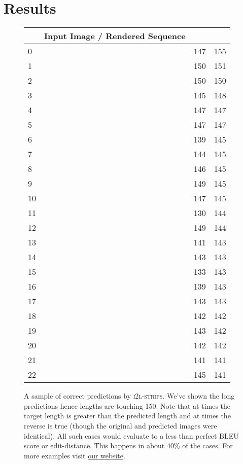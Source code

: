 \documentclass{article}
\newcommand{\website}{https://untrix.github.io/i2l/}
\begin{document}
\section{Results}
\begin{figure*}\begin{tabular}{llcc}
		& Input Image / Rendered Sequence &  &  \\
		\hline
		\scriptsize{0} &  & \scriptsize{147} & \scriptsize{155} \\
\scriptsize{1} &  & \scriptsize{150} & \scriptsize{151} \\
\scriptsize{2} &  & \scriptsize{150} & \scriptsize{150} \\
\scriptsize{3} &  & \scriptsize{145} & \scriptsize{148} \\
\scriptsize{4} &  & \scriptsize{147} & \scriptsize{147} \\
\scriptsize{5} &  & \scriptsize{147} & \scriptsize{147} \\
\scriptsize{6} &  & \scriptsize{139} & \scriptsize{145} \\
\scriptsize{7} &  & \scriptsize{144} & \scriptsize{145} \\
\scriptsize{8} &  & \scriptsize{146} & \scriptsize{145} \\
\scriptsize{9} &  & \scriptsize{149} & \scriptsize{145} \\
\scriptsize{10} &  & \scriptsize{147} & \scriptsize{145} \\
\scriptsize{11} &  & \scriptsize{130} & \scriptsize{144} \\
\scriptsize{12} &  & \scriptsize{149} & \scriptsize{144} \\
\scriptsize{13} &  & \scriptsize{141} & \scriptsize{143} \\
\scriptsize{14} &  & \scriptsize{143} & \scriptsize{143} \\
\scriptsize{15} &  & \scriptsize{133} & \scriptsize{143} \\
\scriptsize{16} &  & \scriptsize{139} & \scriptsize{143} \\
\scriptsize{17} &  & \scriptsize{143} & \scriptsize{143} \\
\scriptsize{18} &  & \scriptsize{142} & \scriptsize{142} \\
\scriptsize{19} &  & \scriptsize{143} & \scriptsize{142} \\
\scriptsize{20} &  & \scriptsize{142} & \scriptsize{142} \\
\scriptsize{21} &  & \scriptsize{141} & \scriptsize{141} \\
\scriptsize{22} &  & \scriptsize{145} & \scriptsize{141} \\
 	\end{tabular}
	\centering
	\caption[A Sample of Correct Predictions]{A sample of correct predictions by \textsc{i2l-strips}. We've shown the long predictions hence lengths are touching 150. Note that at times the target length is greater than the predicted length and at times the reverse is true (though the original and predicted images were identical). All such cases would evaluate to a less than perfect BLEU score or edit-distance. This happens in about 40\% of the cases. For more examples visit \href{\website}{our website}.}
	\label{fig-good-preds}
\end{figure*}
\end{document}
